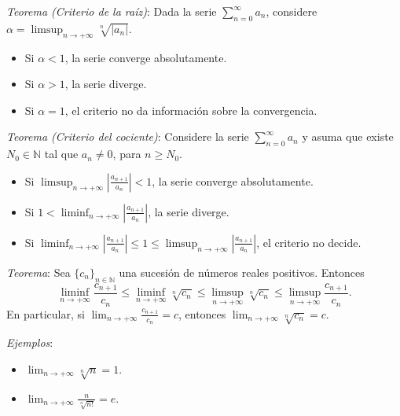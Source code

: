 \documentclass{beamer}
\begin{document}
  \begin{frame}
    \textit{Teorema (Criterio de la raíz)}: Dada la serie $\sum_{n=0}^{\infty} a_n$,
    considere $\alpha = \limsup_{n \to +\infty} \sqrt[n]{|a_n|}$.
    \begin{itemize}[<+->]
      \item Si $\alpha < 1$, la serie converge absolutamente.
      \item Si $\alpha > 1$, la serie diverge.
      \item Si $\alpha = 1$, el criterio no da información sobre la convergencia.
    \end{itemize}
    \vspace{0.3cm}
    \pause

    \textit{Teorema (Criterio del cociente)}: Considere la serie
    $\sum_{n=0}^{\infty} a_n$ y asuma que existe $N_0 \in \mathbb{N}$ tal que
    $a_n \neq 0$, para $n \geq N_0$.
    \begin{itemize}[<+->]
      \item Si $\limsup_{n \to +\infty} \left| \frac{a_{n+1}}{a_n} \right| < 1$,
        la serie converge absolutamente.
      \item Si $1 < \liminf_{n \to +\infty} \left| \frac{a_{n+1}}{a_n} \right|$,
        la serie diverge.
      \item Si $\liminf_{n \to +\infty} \left| \frac{a_{n+1}}{a_n} \right| \leq 1
        \leq \limsup_{n \to +\infty} \left| \frac{a_{n+1}}{a_n} \right|$,
        el criterio no decide.
    \end{itemize}
  \end{frame}

  \begin{frame}
    \textit{Teorema}: Sea $\{c_n\}_{n \in \mathbb{N}}$ una sucesión de números
    reales positivos. Entonces
    \[
      \liminf_{n \to +\infty} \frac{c_{n+1}}{c_n} \leq
      \liminf_{n \to +\infty} \sqrt[n]{c_n} \leq
      \limsup_{n \to +\infty} \sqrt[n]{c_n} \leq
      \limsup_{n \to +\infty} \frac{c_{n+1}}{c_n}.
    \]
    \pause
    En particular, si $\lim_{n \to +\infty} \frac{c_{n+1}}{c_n} = c$, entonces
    $\lim_{n \to +\infty} \sqrt[n]{c_n} = c$.
    \newline\newline
    \pause

    \textit{Ejemplos}:
    \begin{itemize}[<+->]
      \item $\lim_{n \to +\infty} \sqrt[n]{n} = 1$.
      \item $\lim_{n \to +\infty} \frac{n}{\sqrt[n]{n!}} = e$.
    \end{itemize}
  \end{frame}
\end{document}
